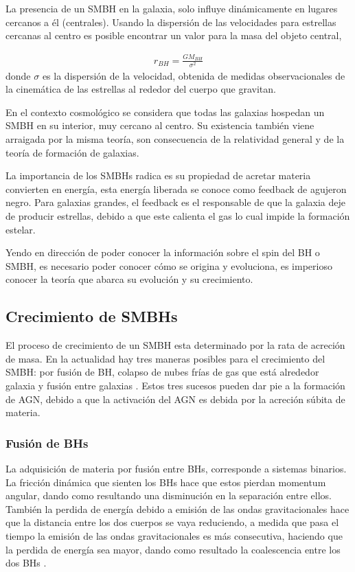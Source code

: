 La presencia de un SMBH en la galaxia, solo influye dinámicamente en lugares cercanos a él (centrales). Usando la dispersión de las velocidades para estrellas cercanas al centro es posible encontrar un valor para la masa del objeto central, 

\begin{align}
    r_{BH}=\frac{GM_{BH}}{\sigma^{2}}
\end{align}
donde $\sigma$ es la dispersión de la velocidad, obtenida de medidas observacionales de la cinemática de las estrellas al rededor del cuerpo que gravitan. 

En el contexto cosmológico se considera que todas las galaxias hospedan un SMBH en su interior, muy cercano al centro. Su existencia también viene arraigada por la misma teoría, son consecuencia de la relatividad general y de la teoría de formación de galaxias. 

La importancia de los SMBHs radica es su propiedad de acretar materia convierten en energía, esta energía liberada se conoce como feedback de agujeron negro. Para galaxias grandes, el feedback es el responsable de que la galaxia deje de producir estrellas, debido a que este calienta el gas lo cual impide la formación estelar.

Yendo en dirección de poder conocer la información sobre el spin del BH o SMBH, es necesario poder conocer cómo se origina y evoluciona, es imperioso conocer la teoría que abarca su evolución y su crecimiento.
\subsection{Crecimiento de SMBHs}
\label{subsec: Crecimiento_SMBHs}

El proceso de crecimiento de un SMBH esta determinado por la rata de acreción de masa. En la actualidad hay tres maneras posibles para el crecimiento del SMBH: por fusión de BH, colapso de nubes frías de gas que está alrededor galaxia y fusión entre galaxias \cite{fanidakis2011}. Estos tres sucesos pueden dar pie a la formación de AGN, debido a que la activación del AGN es debida por la acreción súbita de materia. 
    \subsubsection{Fusión de BHs}
    \label{subsubsec: mergers_BHs}
La adquisición de materia por fusión entre BHs, corresponde a sistemas  binarios. La fricción dinámica que sienten los BHs  hace que estos pierdan momentum angular, dando como resultando una disminución en la separación entre ellos. También la perdida de energía debido a emisión de las ondas gravitacionales hace que la distancia entre los dos cuerpos se vaya reduciendo, a medida que pasa el tiempo la emisión de las ondas gravitacionales es más consecutiva, haciendo que la perdida de energía sea mayor, dando como resultado la coalescencia entre los dos BHs \cite{fanidakis2011}. 

